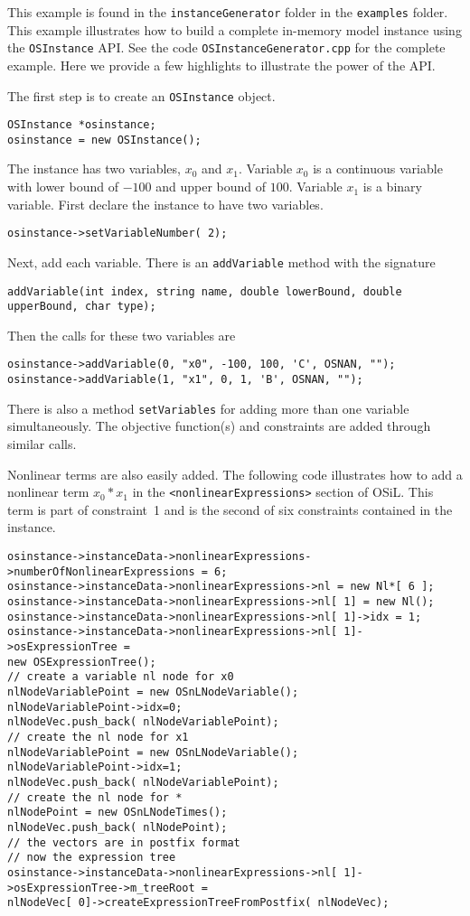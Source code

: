 \documentclass[11pt]{article}
\renewcommand{\_}{{\char"5F}}
\renewcommand{\{}{{\char"7B}}
\renewcommand{\}}{{\char"7D}}
\renewcommand{\^}{{\char"0D}}
\renewcommand{\'}{{\char"0D}}
\begin{document}
This example is found in the {\tt instanceGenerator} folder in the {\tt examples} folder. This example illustrates
how to build a complete in-memory model instance using the {\tt OSInstance} API.
See the code {\tt OSInstanceGenerator.cpp} for the complete example. Here we provide a few highlights to illustrate
the power of the API.

The first step is to create an {\tt OSInstance} object.
\begin{verbatim}
OSInstance *osinstance;
osinstance = new OSInstance();
\end{verbatim}

The instance has two variables, $x_{0}$ and $x_{1}$. Variable $x_{0}$ is a continuous variable with lower bound of $-100$ and upper bound of $100$. Variable $x_{1}$ is a binary variable. First declare the instance to have two variables.
\begin{verbatim}
osinstance->setVariableNumber( 2);
\end{verbatim}
Next, add each variable. There is an {\tt addVariable} method with the signature
\begin{verbatim}
addVariable(int index, string name, double lowerBound, double upperBound, char type);
\end{verbatim}
Then the calls for these two variables are
\begin{verbatim}
osinstance->addVariable(0, "x0", -100, 100, 'C', OSNAN, "");
osinstance->addVariable(1, "x1", 0, 1, 'B', OSNAN, "");
\end{verbatim}
There is also a method {\tt setVariables} for adding more than one variable simultaneously.  The objective function(s) and constraints are added through similar calls.

Nonlinear terms are also easily added.  The following code illustrates how to add a nonlinear term
$x_{0}*x_{1}$ in the {\tt <nonlinearExpressions>} section of  OSiL. This term is part of constraint~1
and is the second of six constraints contained in the instance.
\begin{verbatim}
osinstance->instanceData->nonlinearExpressions->numberOfNonlinearExpressions = 6;
osinstance->instanceData->nonlinearExpressions->nl = new Nl*[ 6 ];
osinstance->instanceData->nonlinearExpressions->nl[ 1] = new Nl();
osinstance->instanceData->nonlinearExpressions->nl[ 1]->idx = 1;
osinstance->instanceData->nonlinearExpressions->nl[ 1]->osExpressionTree =
new OSExpressionTree();
// create a variable nl node for x0
nlNodeVariablePoint = new OSnLNodeVariable();
nlNodeVariablePoint->idx=0;
nlNodeVec.push_back( nlNodeVariablePoint);
// create the nl node for x1
nlNodeVariablePoint = new OSnLNodeVariable();
nlNodeVariablePoint->idx=1;
nlNodeVec.push_back( nlNodeVariablePoint);
// create the nl node for *
nlNodePoint = new OSnLNodeTimes();
nlNodeVec.push_back( nlNodePoint);
// the vectors are in postfix format
// now the expression tree
osinstance->instanceData->nonlinearExpressions->nl[ 1]->osExpressionTree->m_treeRoot =
nlNodeVec[ 0]->createExpressionTreeFromPostfix( nlNodeVec);
\end{verbatim}
\end{document}
